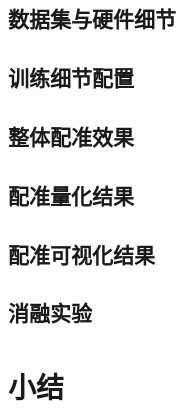 \subsection{数据集与硬件细节}
\subsection{训练细节配置}
\subsection{整体配准效果}
\subsection{配准量化结果}
\subsection{配准可视化结果}
\subsection{消融实验}

\section{小结}